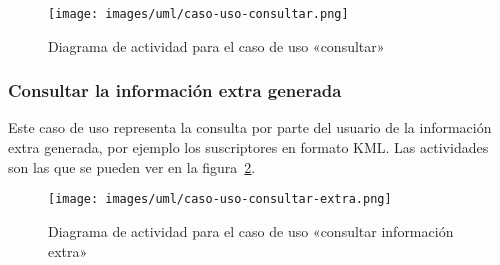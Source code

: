 \begin{figure}[H]
 	\centering
	\texttt{[image: images/uml/caso-uso-consultar.png]}
	\caption{Diagrama de actividad para el caso de uso «consultar»}
	\label{fig:uml:consultar}
\end{figure}

\subsubsection{Consultar la información extra generada}

Este caso de uso representa la consulta por parte del usuario de la 
información extra generada, por ejemplo los suscriptores en formato 
KML. Las actividades son las que se pueden ver en la 
figura~\ref{fig:uml:consultar-extra}.

\begin{figure}[H]
 	\centering
	\texttt{[image: images/uml/caso-uso-consultar-extra.png]}
	\caption{Diagrama de actividad para el caso de uso «consultar información extra»}
	\label{fig:uml:consultar-extra}
\end{figure}

